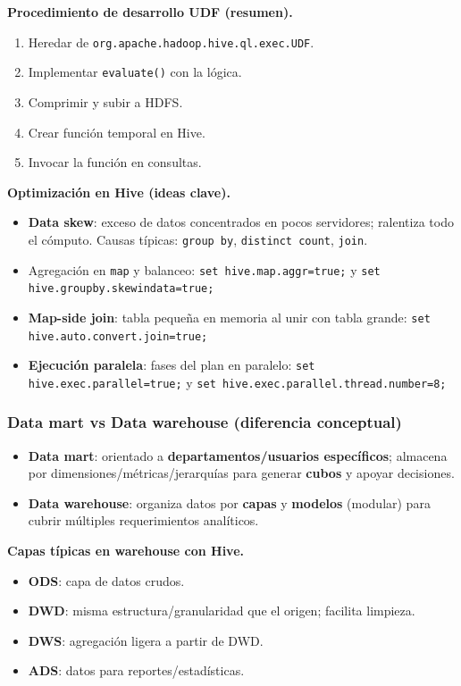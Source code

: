 \documentclass[8pt,a4paper,twocolumn]{article}
\begin{document}
\textbf{Procedimiento de desarrollo UDF (resumen).}
\begin{enumerate}
\item Heredar de \texttt{org.apache.hadoop.hive.ql.exec.UDF}.
\item Implementar \texttt{evaluate()} con la lógica.
\item Comprimir y subir a HDFS.
\item Crear función temporal en Hive.
\item Invocar la función en consultas.
\end{enumerate}

\textbf{Optimización en Hive (ideas clave).}
\begin{itemize}
\item \textbf{Data skew}: exceso de datos concentrados en pocos servidores; ralentiza todo el cómputo. Causas típicas: \texttt{group by}, \texttt{distinct count}, \texttt{join}.
\item Agregación en \texttt{map} y balanceo: \texttt{set hive.map.aggr=true;} y \texttt{set hive.groupby.skewindata=true;}
\item \textbf{Map-side join}: tabla pequeña en memoria al unir con tabla grande: \texttt{set hive.auto.convert.join=true;}
\item \textbf{Ejecución paralela}: fases del plan en paralelo:
\texttt{set hive.exec.parallel=true;} y \texttt{set hive.exec.parallel.thread.number=8;}
\end{itemize}

\subsubsection*{Data mart vs Data warehouse (diferencia conceptual)}
\begin{itemize}
\item \textbf{Data mart}: orientado a \textbf{departamentos/usuarios específicos}; almacena por dimensiones/métricas/jerarquías para generar \textbf{cubos} y apoyar decisiones.
\item \textbf{Data warehouse}: organiza datos por \textbf{capas} y \textbf{modelos} (modular) para cubrir múltiples requerimientos analíticos.
\end{itemize}

\textbf{Capas típicas en warehouse con Hive.}
\begin{itemize}
\item \textbf{ODS}: capa de datos crudos.
\item \textbf{DWD}: misma estructura/granularidad que el origen; facilita limpieza.
\item \textbf{DWS}: agregación ligera a partir de DWD.
\item \textbf{ADS}: datos para reportes/estadísticas.
\end{itemize}
\end{document}
